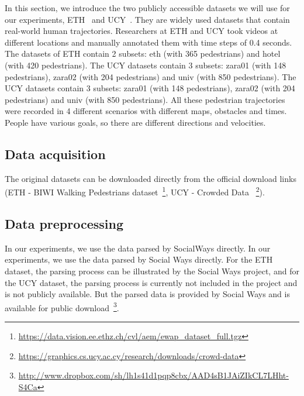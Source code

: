 In this section, we introduce the two publicly accessible datasets we will use for our experiments, ETH~\cite{ETH-biwi} and UCY~\cite{UCY-crowds}. They are widely used datasets that contain real-world human trajectories. Researchers at ETH and UCY took videos at different locations and manually annotated them with time steps of 0.4 seconds. The datasets of ETH contain 2 subsets: eth (with 365 pedestrians) and hotel (with 420 pedestrians). The UCY datasets contain 3  subsets: zara01 (with 148 pedestrians), zara02 (with 204 pedestrians) and univ (with 850 pedestrians). The UCY datasets contain 3 subsets: zara01 (with 148 pedestrians), zara02 (with 204 pedestrians) and univ (with 850 pedestrians). All these pedestrian trajectories were recorded in 4 different scenarios with different maps, obstacles and times. People have various goals, so there are different directions and velocities.

\subsection{Data acquisition}
The original datasets can be downloaded directly from the official download links (ETH - BIWI Walking Pedestrians dataset~\footnote{\url{https://data.vision.ee.ethz.ch/cvl/aem/ewap_dataset_full.tgz}},  UCY - Crowded Data ~\footnote{\url{https://graphics.cs.ucy.ac.cy/research/downloads/crowd-data}}).


\subsection{Data preprocessing}
In our experiments, we use the data parsed by SocialWays directly. In our experiments, we use the data parsed by Social Ways directly. For the ETH dataset, the parsing process can be illustrated by the Social Ways project, and for the UCY dataset, the parsing process is currently not included in the project and is not publicly available. But the parsed data is provided by Social Ways and is available for public download~\footnote{\url{http://www.dropbox.com/sh/lh1s41d1pqp8cbx/AAD4sB1JAiZIkCL7LHht-S4Ca}}.